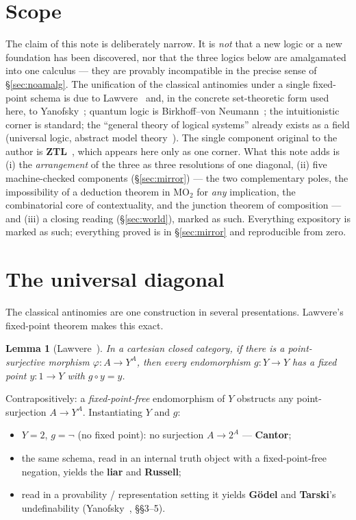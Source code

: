 \documentclass[11pt]{article}
\newtheorem{lem}{Lemma}[section]
\theoremstyle{remark}
\begin{document}
\section{Scope}\label{sec:scope}

The claim of this note is deliberately narrow. It is \emph{not} that a new
logic or a new foundation has been discovered, nor that the three logics below
are amalgamated into one calculus --- they are provably incompatible in the
precise sense of \S\ref{sec:noamalg}. The unification of the classical
antinomies under a single fixed-point schema is due to Lawvere~\cite{lawvere}
and, in the concrete set-theoretic form used here, to
Yanofsky~\cite{yanofsky}; quantum logic is Birkhoff--von
Neumann~\cite{bvn}; the intuitionistic corner is standard; the ``general
theory of logical systems'' already exists as a field (universal logic,
abstract model theory~\cite{beziau}). The single component original to the
author is \textbf{ZTL}~\cite{ztl}, which appears here only as one corner.
What this note adds is (i) the \emph{arrangement} of the three as three
resolutions of one diagonal, (ii) five machine-checked components
(\S\ref{sec:mirror}) --- the two complementary poles, the impossibility of
a deduction theorem in $\mathrm{MO}_2$ for \emph{any} implication, the
combinatorial core of contextuality, and the junction theorem of
composition --- and
(iii) a closing reading (\S\ref{sec:world}), marked as such.
Everything expository is marked as such; everything proved is in
\S\ref{sec:mirror} and reproducible from zero.

\section{The universal diagonal}\label{sec:diag}

The classical antinomies are one construction in several presentations.
Lawvere's fixed-point theorem makes this exact.

\begin{lem}[Lawvere~\cite{lawvere}]
In a cartesian closed category, if there is a point-surjective morphism
$\varphi : A \to Y^{A}$, then every endomorphism $g : Y \to Y$ has a fixed
point $y : 1 \to Y$ with $g \circ y = y$.
\end{lem}

Contrapositively: a \emph{fixed-point-free} endomorphism of $Y$ obstructs any
point-surjection $A \to Y^{A}$. Instantiating $Y$ and $g$:

\begin{itemize}
\item $Y = 2$, $g = \neg$ (no fixed point): no surjection $A \to 2^{A}$ ---
\textbf{Cantor};
\item the same schema, read in an internal truth object with a
fixed-point-free negation, yields the \textbf{liar} and \textbf{Russell};
\item read in a provability / representation setting it yields
\textbf{G\"odel} and \textbf{Tarski}'s undefinability
(Yanofsky~\cite{yanofsky}, \S\S3--5).
\end{itemize}
\end{document}
